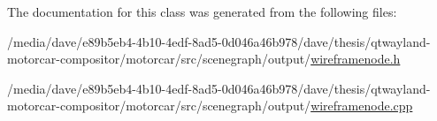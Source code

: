 The documentation for this class was generated from the following files\-:\begin{DoxyCompactItemize}
\item 
/media/dave/e89b5eb4-\/4b10-\/4edf-\/8ad5-\/0d046a46b978/dave/thesis/qtwayland-\/motorcar-\/compositor/motorcar/src/scenegraph/output/\hyperlink{wireframenode_8h}{wireframenode.\-h}\item 
/media/dave/e89b5eb4-\/4b10-\/4edf-\/8ad5-\/0d046a46b978/dave/thesis/qtwayland-\/motorcar-\/compositor/motorcar/src/scenegraph/output/\hyperlink{wireframenode_8cpp}{wireframenode.\-cpp}\end{DoxyCompactItemize}
